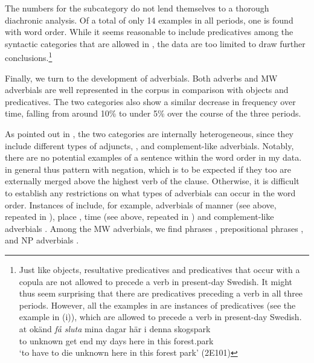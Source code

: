 \documentclass[output=paper, colorlinks, citecolor=brown]{langscibook}
\begin{document}
The numbers for the  subcategory do not lend themselves to a thorough diachronic analysis. Of a total of only 14 examples in all periods, one is found with  word order. While it seems reasonable to include predicatives among the syntactic categories that are allowed in , the data are too limited to draw further conclusions.\footnote{Just like objects, resultative predicatives and predicatives that occur with a copula are not allowed to precede a verb in present-day Swedish. It might thus seem surprising that there are predicatives preceding a verb in all three periods. However, all the examples in  are instances of  predicatives (see the example in (i)), which are allowed to precede a verb in present-day Swedish.  
\ea \gll at okänd \textit{få} \textit{sluta} mina  dagar  här  i  denna  skogspark\\
         to unknown  get  end  my  days  here  in  this  forest.park\\
     \glt ‘to have to die unknown here in this forest park’ (2E101)
\z}



Finally, we turn to the development of adverbials. Both adverbs and MW adverbials are well represented in the corpus in comparison with objects and predicatives. The two  categories also show a similar decrease in frequency over time, falling from around 10\% to under 5\% over the course of the three periods.\largerpage[3]



As pointed out in , the two  categories are internally heterogeneous, since they include different types of adjuncts, , and complement-like adverbials. Notably, there are no potential examples of a sentence  within the  word order in my data.  in general thus pattern with negation, which is to be expected if they too are externally merged above the highest verb of the clause. Otherwise, it is difficult to establish any restrictions on what types of adverbials can occur in the  word order. Instances of  include, for example, adverbials of manner (see  above, repeated in ), place , time (see  above, repeated in ) and complement-like adverbials . Among the MW adverbials, we find  phrases , prepositional phrases , and NP adverbials .
\end{document}
